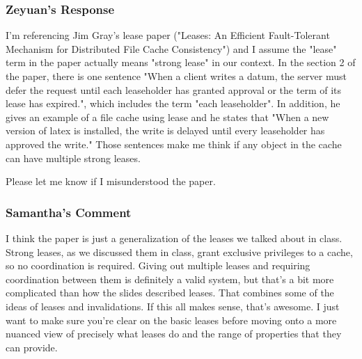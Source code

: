 \subsubsection{Zeyuan's Response}
I'm referencing Jim Gray's lease paper ("Leases: An Efficient Fault-Tolerant Mechanism for Distributed File Cache Consistency") and I assume the "lease" term in the paper actually means "strong lease" in our context. In the section 2 of the paper, there is one sentence "When a client writes a datum, the server must defer the request until each leaseholder has granted approval or the term of its lease has expired.", which includes the term "each leaseholder". In addition, he gives an example of a file cache using lease and he states that "When a new version of latex is installed, the write is delayed until every leaseholder has approved the write."
Those sentences make me think if any object in the cache can have multiple strong leases.

Please let me know if I misunderstood the paper.

\subsubsection{Samantha's Comment}
I think the paper is just a generalization of the leases we talked about in class. Strong leases, as we discussed them in class, grant exclusive privileges to a cache, so no coordination is required. Giving out multiple leases and requiring coordination between them is definitely a valid system, but that's a bit more complicated than how the slides described leases. That combines some of the ideas of leases and invalidations. If this all makes sense, that's awesome. I just want to make sure you're clear on the basic leases before moving onto a more nuanced view of precisely what leases do and the range of properties that they can provide.